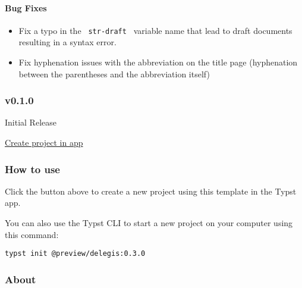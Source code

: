 \paragraph{Bug Fixes}\label{bug-fixes}

\begin{itemize}
\tightlist
\item
  Fix a typo in the \texttt{\ str-draft\ } variable name that lead to
  draft documents resulting in a syntax error.
\item
  Fix hyphenation issues with the abbreviation on the title page
  (hyphenation between the parentheses and the abbreviation itself)
\end{itemize}

\subsubsection{v0.1.0}\label{v0.1.0}

Initial Release

\href{/app?template=delegis&version=0.3.0}{Create project in app}

\subsubsection{How to use}\label{how-to-use}

Click the button above to create a new project using this template in
the Typst app.

You can also use the Typst CLI to start a new project on your computer
using this command:

\begin{verbatim}
typst init @preview/delegis:0.3.0
\end{verbatim}



\subsubsection{About}\label{about}

